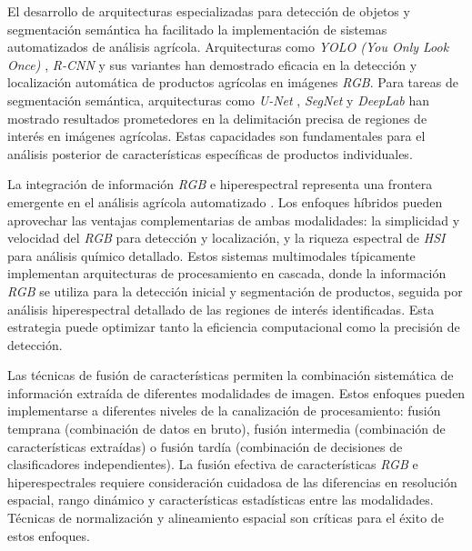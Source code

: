 \vspace{5mm}

El desarrollo de arquitecturas especializadas para detección de objetos y segmentación semántica ha facilitado la implementación de sistemas automatizados de análisis agrícola. Arquitecturas como \emph{YOLO (You Only Look Once)} \cite{redmon2016lookonceunifiedrealtime}, \emph{R-CNN} \cite{girshick2014richfeaturehierarchiesaccurate} y sus variantes han demostrado eficacia en la detección y localización automática de productos agrícolas en imágenes \emph{RGB}. Para tareas de segmentación semántica, arquitecturas como \emph{ U-Net} \cite{ronneberger2015unetconvolutionalnetworksbiomedical}, \emph{SegNet} \cite{badrinarayanan2016segnetdeepconvolutionalencoderdecoder} y \emph{DeepLab} \cite{chen2017deeplabsemanticimagesegmentation} han mostrado resultados prometedores en la delimitación precisa de regiones de interés en imágenes agrícolas. Estas capacidades son fundamentales para el análisis posterior de características específicas de productos individuales.

\vspace{5mm}

La integración de información \emph{RGB} e hiperespectral representa una frontera emergente en el análisis agrícola automatizado \cite{jimaging5050052}. Los enfoques híbridos pueden aprovechar las ventajas complementarias de ambas modalidades: la simplicidad y velocidad del \emph{RGB} para detección y localización, y la riqueza espectral de \emph{HSI} para análisis químico detallado. Estos sistemas multimodales típicamente implementan arquitecturas de procesamiento en cascada, donde la información \emph{RGB} se utiliza para la detección inicial y segmentación de productos, seguida por análisis hiperespectral detallado de las regiones de interés identificadas. Esta estrategia puede optimizar tanto la eficiencia computacional como la precisión de detección.

\vspace{5mm}

Las técnicas de fusión de características permiten la combinación sistemática de información extraída de diferentes modalidades de imagen. Estos enfoques pueden implementarse a diferentes niveles de la canalización de procesamiento: fusión temprana (combinación de datos en bruto), fusión intermedia (combinación de características extraídas) o fusión tardía (combinación de decisiones de clasificadores independientes). La fusión efectiva de características \emph{RGB} e hiperespectrales requiere consideración cuidadosa de las diferencias en resolución espacial, rango dinámico y características estadísticas entre las modalidades. Técnicas de normalización y alineamiento espacial son críticas para el éxito de estos enfoques.

